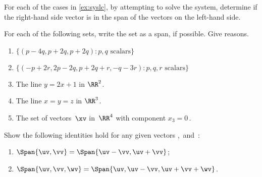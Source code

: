 \begin{exercise} \label{ex:} 
For each of the cases in \autoref{ex:syslc}, by attempting to solve the system, determine if the right-hand side vector is in the span of the vectors on the left-hand side.
\end{exercise}




\begin{exercise} \label{ex:} 
For each of the following sets, write the set as a span, if possible.
Give reasons.
\begin{enumerate}
\item \(\{(p-4q,p+2q,p+2q): p,q\text{ scalars}\}\)

\item \(\{(-p+2r,2p-2q,p+2q+r,-q-3r): p,q,r\text{ scalars}\}\)

\item The line \(y=2x+1\) in \(\RR^2\).

\item The line \(x=y=z\) in \(\RR^3\).

\item The set of vectors~\(\xv\) in~\(\RR^4\) with component \(x_3=0\)\,.
\end{enumerate}
\end{exercise}







\begin{exercise} \label{ex:} 
Show the following identities hold for any given vectors \uv,\vv\ and~\wv:
\begin{enumerate}
\item \(\Span\{\uv,\vv\}=\Span\{\uv-\vv,\uv+\vv\}\);
\item \(\Span\{\uv,\vv,\wv\}=\Span\{\uv,\uv-\vv,\uv+\vv+\wv\}\).
\end{enumerate}
\end{exercise}








